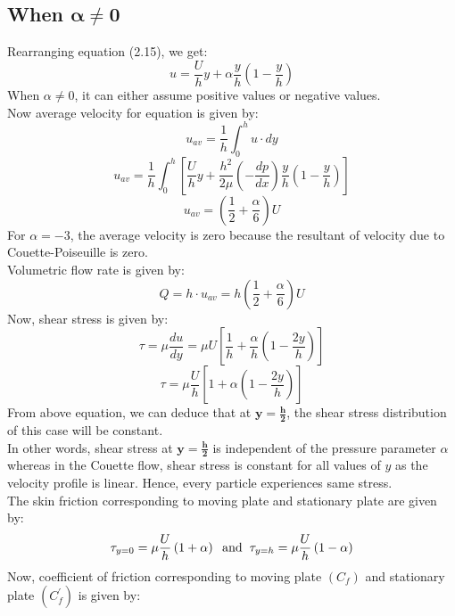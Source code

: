 \documentclass[14pt,one side, a4paper]{extbook}
\begin{document}
	 	\subsection{When $\mathbf{\alpha \neq 0}$}
	 	Rearranging equation (2.15), we get:
	 	\begin{equation}
	 		u=\frac{U}{h}y+\alpha\frac{y}{h}\left(1-\frac{y}{h}\right)
	 	\end{equation}
	 	When $\alpha \neq 0$, it can either assume positive values or negative values. \\Now average velocity for equation is given by:
	 	\begin{equation}
	 		u_{av}=\frac{1}{h}\int_{0}^{h}u\cdot dy
	 	\end{equation} 
	 	$$u_{av}=\frac{1}{h}\int_{0}^{h}\left[\frac{U}{h}y+\frac{h^{2}}{2\mu}\left(-\frac{dp}{dx}\right)\frac{y}{h}\left(1-\frac{y}{h}\right)\right]$$
	 	$$u_{av}=\left(\frac{1}{2}+\frac{\alpha}{6}\right)U$$
	 	For $\alpha=-3$, the average velocity is zero because the resultant of velocity due to Couette-Poiseuille is zero.
	 	\\Volumetric flow rate is given by:
	 	\begin{equation}
	 		Q=h\cdot u_{av}=h\left(\frac{1}{2}+\frac{\alpha}{6}\right)U
	 	\end{equation} 
	 	Now, shear stress is given by:
	 	\begin{equation}
	 		\tau=\mu \frac{du}{dy}=\mu U\left[\frac{1}{h}+\frac{\alpha}{h}\left(1-\frac{2y}{h}\right)\right]	
	 	\end{equation} 
	 	$$\tau=\mu \frac{U}{h}\left[1+\alpha\left(1-\frac{2y}{h}\right)\right]$$
	 	From above equation, we can deduce that at $\mathbf{y = \frac{h}{2}}$, the shear stress distribution of this case will be constant. 
	 	\\In other words, shear stress at $\mathbf{y = \frac{h}{2}}$ is independent of the pressure parameter $\alpha$ whereas in the Couette flow, shear stress is constant for all values of $y$ as the velocity profile is linear. Hence, every particle experiences same stress. 
	 	\\The skin friction corresponding to moving plate and stationary plate are given by:
	 	\begin{equation}
	 		{\tau_{y=0}=\mu\frac{U}{h}\left(1+\alpha\right)\hspace{0.2cm} \textrm{and}\hspace{0.2cm} \tau_{y=h}=\mu\frac{U}{h}\left(1-\alpha\right)}
	 	\end{equation} 
	 	Now, coefficient of friction corresponding to moving plate $\left(C_{f}\right)$ and stationary plate $\left(C_{f}^{'}\right)$ is given by:
\end{document}

